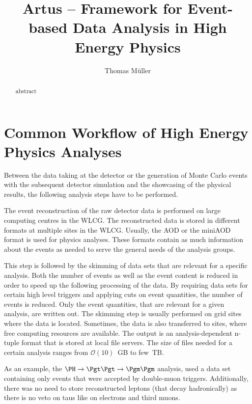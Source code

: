 \documentclass[3p]{elsarticle}
\begin{document}
\begin{frontmatter}
\title{Artus -- Framework for Event-based Data Analysis in High Energy Physics}

\author[kit]{Thomas M\"uller}
\address[kit]{Karlsruhe Institute of Technology, Wolfgang-Gaede-Stra\ss{}e 1, D-76131 Karlsruhe}

\begin{abstract}
abstract
\end{abstract}

\end{frontmatter}


\section{Common Workflow of High Energy Physics Analyses \label{section_artus_analysis_workflow}}

Between the data taking at the detector or the generation of Monte Carlo events with the subsequent detector simulation and the showcasing of the physical results, the following analysis steps have to be performed.

The event reconstruction of the raw detector data is performed on large computing centres in the WLCG. The reconstructed data is stored in different formats at multiple sites in the WLCG. Usually, the AOD or the miniAOD format is used for physics analyses. These formats contain as much information about the events as needed to serve the general needs of the analysis groups.

This step is followed by the skimming of data sets that are relevant for a specific analysis. Both the number of events as well as the event content is reduced in order to speed up the following processing of the data. By requiring data sets for certain high level triggers and applying cuts on event quantities, the number of events is reduced. Only the event quantities, that are relevant for a given analysis, are written out. The skimming step is usually performed on grid sites where the data is located. Sometimes, the data is also transferred to sites, where free computing resources are available. The output is an analysis-dependent n-tuple format that is stored at local file servers. The size of files needed for a certain analysis ranges from $\mathcal O(10)$~GB to few~TB.

As an example, the $\PH\to\Pgt\Pgt\to\Pgm\Pgm$ analysis, used a data set containing only events that were accepted by double-muon triggers. Additionally, there was no need to store reconstructed \Pgt leptons (that decay hadronically) as there is no veto on taus like on electrons and third muons.
\end{document}
